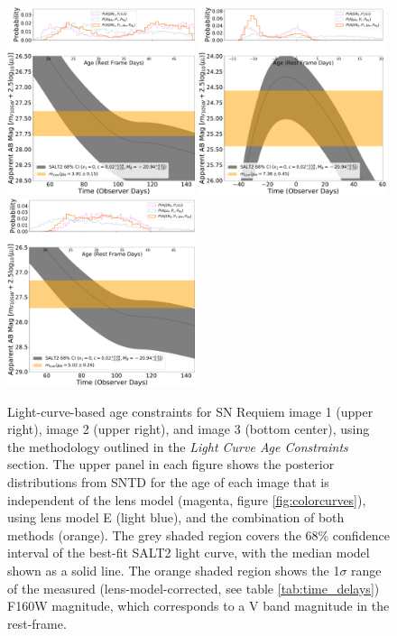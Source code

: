 \documentclass[12pt,dvipsnames]{article}
\def\SNABC{SN Requiem\xspace}
\begin{document}
\begin{figure}
    \centering
    \includegraphics[width=0.49\textwidth]{Paper/Figures/lightcurve_image1.pdf}
    \includegraphics[width=0.49\textwidth]{Paper/Figures/lightcurve_image2.pdf}
    \includegraphics[width=0.49\textwidth]{Paper/Figures/lightcurve_image3.pdf}
    \caption{Light-curve-based age constraints for \SNABC image 1 (upper right), image 2 (upper right), and image 3 (bottom center), using the methodology outlined in the \textit{Light Curve Age Constraints} section. The upper panel in each figure shows the posterior distributions from SNTD for the age of each image that is independent of the lens model (magenta, figure \ref{fig:colorcurves}), using lens model E (light blue), and the combination of both methods (orange). The grey shaded region covers the 68\% confidence interval of the best-fit SALT2 light curve, with the median model shown as a solid line. The orange shaded region shows the 1$\sigma$ range of the measured (lens-model-corrected, see table \ref{tab:time_delays}) F160W magnitude, which corresponds to a V band magnitude in the rest-frame.}
    \label{fig:lightcurves}
\end{figure}
\end{document}
